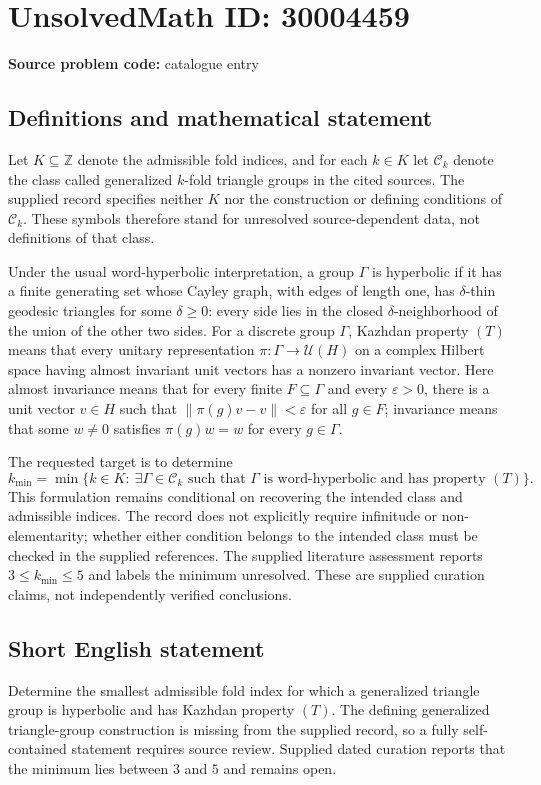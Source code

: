 \documentclass[11pt]{article}
\newcommand{\Z}{\mathbb{Z}}
\begin{document}
\section*{UnsolvedMath ID: 30004459}
\textbf{Source problem code:} catalogue entry
\subsection{Definitions and mathematical statement}
Let \(K\subseteq\Z\) denote the admissible fold indices, and for each \(k\in K\) let \(\mathcal C_k\) denote the class called generalized \(k\)-fold triangle groups in the cited sources. The supplied record specifies neither \(K\) nor the construction or defining conditions of \(\mathcal C_k\). These symbols therefore stand for unresolved source-dependent data, not definitions of that class.

Under the usual word-hyperbolic interpretation, a group \(\Gamma\) is hyperbolic if it has a finite generating set whose Cayley graph, with edges of length one, has \(\delta\)-thin geodesic triangles for some \(\delta\geq0\): every side lies in the closed \(\delta\)-neighborhood of the union of the other two sides. For a discrete group \(\Gamma\), Kazhdan property \((T)\) means that every unitary representation \(\pi:\Gamma\to\mathcal U(H)\) on a complex Hilbert space having almost invariant unit vectors has a nonzero invariant vector. Here almost invariance means that for every finite \(F\subseteq\Gamma\) and every \(\varepsilon>0\), there is a unit vector \(v\in H\) such that \(\|\pi(g)v-v\|<\varepsilon\) for all \(g\in F\); invariance means that some \(w\neq0\) satisfies \(\pi(g)w=w\) for every \(g\in\Gamma\).

The requested target is to determine
\[
 k_{\min}=\min\bigl\{k\in K:\ \exists\Gamma\in\mathcal C_k\text{ such that }\Gamma\text{ is word-hyperbolic and has property }(T)\bigr\}.
\]
This formulation remains conditional on recovering the intended class and admissible indices. The record does not explicitly require infinitude or non-elementarity; whether either condition belongs to the intended class must be checked in the supplied references. The supplied literature assessment reports \(3\leq k_{\min}\leq5\) and labels the minimum unresolved. These are supplied curation claims, not independently verified conclusions.
\subsection{Short English statement}
Determine the smallest admissible fold index for which a generalized triangle group is hyperbolic and has Kazhdan property \((T)\). The defining generalized triangle-group construction is missing from the supplied record, so a fully self-contained statement requires source review. Supplied dated curation reports that the minimum lies between \(3\) and \(5\) and remains open.
\end{document}
